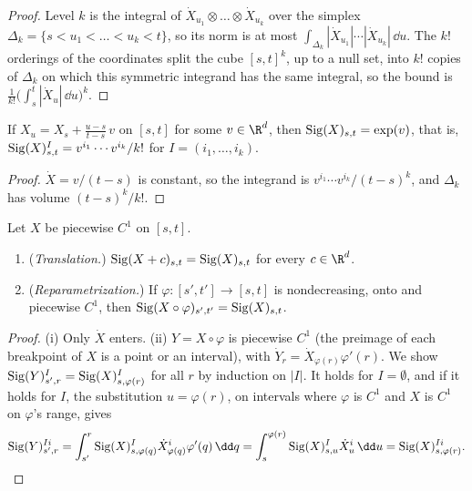 \begin{proof}
Level $k$ is the integral of $\dot X_{u_1}\otimes\dots\otimes\dot X_{u_k}$ over the simplex
$\Delta_k=\{s<u_1<\dots<u_k<t\}$, so its norm is at most
$\int_{\Delta_k}|\dot X_{u_1}|\cdots|\dot X_{u_k}|\,\dd u$. The $k!$ orderings of the coordinates split the
cube $[s,t]^k$, up to a null set, into $k!$ copies of $\Delta_k$ on which this symmetric integrand has the
same integral, so the bound is $\frac1{k!}\big(\int_s^t|\dot X_u|\,\dd u\big)^k$.
\end{proof}

\begin{proposition}\label{prop:sig-segment}
If $X_u=X_s+\frac{u-s}{t-s}\,v$ on $[s,t]$ for some $v\in\R^d$, then $\operatorname{Sig}(X)_{s,t}=\exp(v)$, that is,
$\operatorname{Sig}(X)^I_{s,t}=v^{i_1}\cdots v^{i_k}/k!$ for $I=(i_1,\dots,i_k)$.
\end{proposition}

\begin{proof}
$\dot X=v/(t-s)$ is constant, so the integrand is $v^{i_1}\cdots v^{i_k}/(t-s)^k$, and $\Delta_k$ has volume
$(t-s)^k/k!$.
\end{proof}

\begin{proposition}[Invariances]\label{prop:sig-invariance}
Let $X$ be piecewise $C^1$ on $[s,t]$.
\begin{enumerate}[label=(\roman*)]
  \item (\emph{Translation.}) $\operatorname{Sig}(X+c)_{s,t}=\operatorname{Sig}(X)_{s,t}$ for every $c\in\R^d$.
  \item (\emph{Reparametrization.}) If $\varphi:[s',t']\to[s,t]$ is nondecreasing, onto and piecewise $C^1$,
    then $\operatorname{Sig}(X\circ\varphi)_{s',t'}=\operatorname{Sig}(X)_{s,t}$.
\end{enumerate}
\end{proposition}

\begin{proof}
(i) Only $\dot X$ enters. (ii) $Y=X\circ\varphi$ is piecewise $C^1$ (the preimage of each breakpoint of $X$ is a
point or an interval), with $\dot Y_r=\dot X_{\varphi(r)}\varphi'(r)$. We show
$\operatorname{Sig}(Y)^I_{s',r}=\operatorname{Sig}(X)^I_{s,\varphi(r)}$ for all $r$ by induction on $|I|$. It holds for $I=\emptyset$, and
if it holds for $I$, the substitution $u=\varphi(r)$, on intervals where $\varphi$ is $C^1$ and $X$ is $C^1$ on
$\varphi$'s range, gives
\[
  \sigSig(Y)^{Ii}_{s',r}=\int_{s'}^r\sigSig(X)^I_{s,\varphi(q)}\dot X^i_{\varphi(q)}\varphi'(q)\,\dd q
  =\int_s^{\varphi(r)}\sigSig(X)^I_{s,u}\dot X^i_u\,\dd u=\sigSig(X)^{Ii}_{s,\varphi(r)} .\qedhere
\]
\end{proof}

